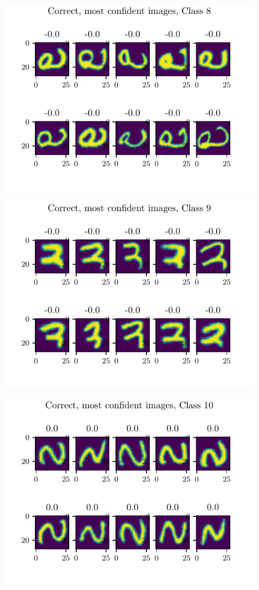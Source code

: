 \documentclass[11pt]{article}
\begin{document}
\includegraphics{figures/2d_confident_imgs_class_8.pdf}

\includegraphics{figures/2d_confident_imgs_class_9.pdf}

\includegraphics{figures/2d_confident_imgs_class_10.pdf}
\end{document}
